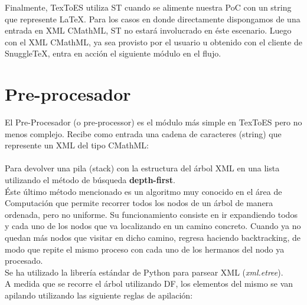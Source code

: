 Finalmente, TexToES utiliza ST cuando se alimente nuestra PoC con un string que represente LaTeX. Para los casos en donde directamente dispongamos de una entrada en XML CMathML, ST no estará involucrado en éste escenario.
Luego con el XML CMathML, ya sea provisto por el usuario u obtenido con el cliente de SnuggleTeX, entra en acción el siguiente módulo en el flujo.

\section{Pre-procesador}

El Pre-Procesador (o pre-processor) es el módulo más simple en TexToES pero no menos complejo. Recibe como entrada una cadena de caracteres (string) que represente un XML del tipo CMathML:\\[0.01cm]

\\[0.01cm]

Para devolver una pila (stack) con la estructura del árbol XML en una lista utilizando el método de búsqueda \textbf{depth-first}.\\

Éste último método mencionado es un algoritmo muy conocido en el área de Computación que permite recorrer todos los nodos de un árbol de manera ordenada, pero no uniforme. Su funcionamiento consiste en ir expandiendo todos y cada uno de los nodos que va localizando en un camino concreto. Cuando ya no quedan más nodos que visitar en dicho camino, regresa haciendo backtracking, de modo que repite el mismo proceso con cada uno de los hermanos del nodo ya procesado.\\

Se ha utilizado la librería estándar de Python para parsear XML (\textit{xml.etree}).\\

A medida que se recorre el árbol utilizando DF, los elementos del mismo se van apilando utilizando las siguiente reglas de apilación:


